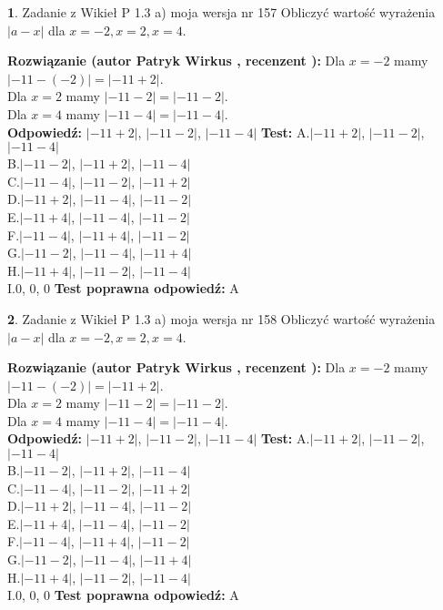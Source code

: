 \documentclass[12pt, a4paper]{article}
\theoremstyle{definition} %
\newtheorem{zad}{}
\newcommand{\zadStart}[1]{\begin{zad}#1\newline}
\newcommand{\zadStop}{\end{zad}}
\newcommand{\rozwStart}[2]{\noindent \textbf{Rozwiązanie (autor #1 , recenzent #2): }\newline}
\newcommand{\rozwStop}{\newline}
\newcommand{\odpStart}{\noindent \textbf{Odpowiedź:}\newline}
\newcommand{\odpStop}{\newline}
\newcommand{\testStart}{\noindent \textbf{Test:}\newline}
\newcommand{\testStop}{\newline}
\newcommand{\kluczStart}{\noindent \textbf{Test poprawna odpowiedź:}\newline}
\newcommand{\kluczStop}{\newline}
\begin{document}
\zadStart{Zadanie z Wikieł P 1.3 a) moja wersja nr 157}
Obliczyć wartość wyrażenia $|a - x|$ dla $x=-2,x=2,x=4$.
\zadStop
\rozwStart{Patryk Wirkus}{}
Dla $x = -2$ mamy $|-11 - (-2)| = |-11 + 2|$.\\
Dla $x = 2$ mamy $|-11 - 2| = |-11 - 2|$.\\
Dla $x = 4$ mamy $|-11 - 4| = |-11 - 4|$.\\
\rozwStop
\odpStart
$|-11 + 2|$, $|-11 - 2|$, $|-11 - 4|$
\odpStop
\testStart
A.$|-11 + 2|$, $|-11 - 2|$, $|-11 - 4|$\\
B.$|-11 - 2|$, $|-11 + 2|$, $|-11 - 4|$\\
C.$|-11 - 4|$, $|-11 - 2|$, $|-11 + 2|$\\
D.$|-11 + 2|$, $|-11 - 4|$, $|-11 - 2|$\\
E.$|-11 + 4|$, $|-11 - 4|$, $|-11 - 2|$\\
F.$|-11 - 4|$, $|-11 + 4|$, $|-11 - 2|$\\
G.$|-11 - 2|$, $|-11 - 4|$, $|-11 + 4|$\\
H.$|-11 + 4|$, $|-11 - 2|$, $|-11 - 4|$\\
I.$0$, $0$, $0$
\testStop
\kluczStart
A
\kluczStop



\zadStart{Zadanie z Wikieł P 1.3 a) moja wersja nr 158}
Obliczyć wartość wyrażenia $|a - x|$ dla $x=-2,x=2,x=4$.
\zadStop
\rozwStart{Patryk Wirkus}{}
Dla $x = -2$ mamy $|-11 - (-2)| = |-11 + 2|$.\\
Dla $x = 2$ mamy $|-11 - 2| = |-11 - 2|$.\\
Dla $x = 4$ mamy $|-11 - 4| = |-11 - 4|$.\\
\rozwStop
\odpStart
$|-11 + 2|$, $|-11 - 2|$, $|-11 - 4|$
\odpStop
\testStart
A.$|-11 + 2|$, $|-11 - 2|$, $|-11 - 4|$\\
B.$|-11 - 2|$, $|-11 + 2|$, $|-11 - 4|$\\
C.$|-11 - 4|$, $|-11 - 2|$, $|-11 + 2|$\\
D.$|-11 + 2|$, $|-11 - 4|$, $|-11 - 2|$\\
E.$|-11 + 4|$, $|-11 - 4|$, $|-11 - 2|$\\
F.$|-11 - 4|$, $|-11 + 4|$, $|-11 - 2|$\\
G.$|-11 - 2|$, $|-11 - 4|$, $|-11 + 4|$\\
H.$|-11 + 4|$, $|-11 - 2|$, $|-11 - 4|$\\
I.$0$, $0$, $0$
\testStop
\kluczStart
A
\kluczStop
\end{document}
